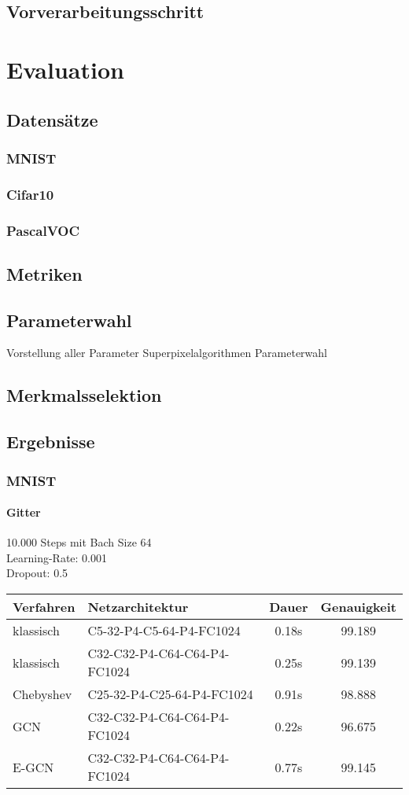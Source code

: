 \section{Vorverarbeitungsschritt}

\chapter{Evaluation}
\section{Datensätze}
\subsection{MNIST}
\subsection{Cifar10}
\subsection{PascalVOC}
\section{Metriken}
\section{Parameterwahl}
Vorstellung aller Parameter
Superpixelalgorithmen Parameterwahl
\section{Merkmalsselektion}
\newpage
\section{Ergebnisse}
\subsection{MNIST}
\subsubsection{Gitter}

10.000 Steps mit Bach Size 64\\
Learning-Rate: 0.001\\
Dropout: 0.5\\

\begin{tabular}{p{2.5cm}p{7.5cm}cc}
  \hline
  Verfahren & Netzarchitektur & Dauer & Genauigkeit\\
  \hline
  klassisch & C5-32-P4-C5-64-P4-FC1024 & 0.18s & 99.189\\
  klassisch & C32-C32-P4-C64-C64-P4-FC1024 & 0.25s & 99.139\\
  Chebyshev & C25-32-P4-C25-64-P4-FC1024 & 0.91s & 98.888\\
  GCN & C32-C32-P4-C64-C64-P4-FC1024 & 0.22s & 96.675\\
  E-GCN & C32-C32-P4-C64-C64-P4-FC1024 & 0.77s & 99.145\\
  \hline
\end{tabular}


